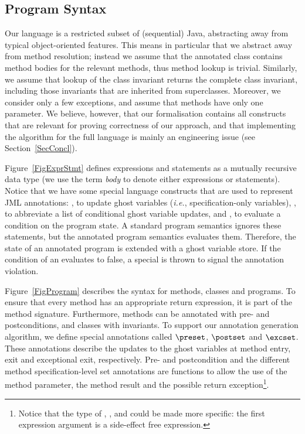 \subsection{Program Syntax}\label{SecSyntax}

Our language is a restricted subset of (sequential) Java, abstracting
away from typical object-oriented features. This means in particular
that we abstract away from method resolution; instead we assume that
the annotated class contains method bodies for the relevant methods,
thus method lookup is trivial. Similarly, we assume that lookup of the
class invariant returns the complete class invariant, including those
invariants that are inherited from superclasses. Moreover, we consider
only a few exceptions, and assume that methods have only one
parameter. We believe, however, that our formalisation contains all
constructs that are relevant for proving correctness of our approach,
and that implementing the algorithm for the full language is mainly an
engineering issue (see Section~\ref{SecConcl}).

Figure~\ref{FigExprStmt} defines expressions and statements as a
mutually recursive data type (we use the term \emph{body} to denote
either expressions or statements). Notice that we have some special
language constructs that are used to represent JML annotations: \Set,
to update ghost variables (\emph{i.e.}, specification-only variables),
\CaseJML, to abbreviate a list of conditional ghost variable updates,
and \Assert, to evaluate a condition on the program state. A standard
program semantics ignores these statements, but the annotated program
semantics evaluates them. Therefore, the state of an annotated program
is extended with a ghost variable store.
If the condition of an \Assert evaluates to false, a special \JMLExc is thrown to
signal the annotation violation.

Figure~\ref{FigProgram} describes the syntax for methods,
classes and programs. To ensure that every method has an appropriate
return expression, it is part of the method signature.
Furthermore, methods can be annotated with pre- and postconditions, and
classes with invariants. To support our annotation generation
algorithm, we define special annotations called
\(\preset\), \(\postset\) and \(\excset\). These annotations describe
the updates to the ghost variables at method entry, exit and
exceptional exit, respectively.
Pre- and postcondition and the different method specification-level set
annotations are functions to allow the use of the method parameter,
the method result and the possible return exception\footnote{Notice
that the type of \pre, \post, \preset and \postset could be made more specific:
the first expression argument is a side-effect free expression.}.

